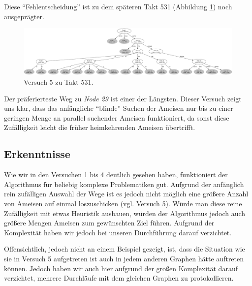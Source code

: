 Diese "`Fehlentscheidung"' ist zu dem späteren Takt 531 (Abbildung \ref{fig:v5_531}) noch ausgeprägter.

\begin{figure}[htbp]
	\includegraphics[width=\textwidth]{images/v5_531.png}
	\caption{Versuch 5 zu Takt 531.}
	\label{fig:v5_531}
\end{figure}

Der präferierteste Weg zu \emph{Node 29} ist einer der Längsten.
Dieser Versuch zeigt uns klar, dass das anfängliche "`blinde"' Suchen der Ameisen  nur bis zu einer geringen Menge an parallel suchender Ameisen funktioniert, da sonst diese Zufälligkeit leicht die früher heimkehrenden Ameisen übertrifft.

\subsection{Erkenntnisse}
Wie wir in den Versuchen 1 bis 4 deutlich gesehen haben, funktioniert der Algorithmus für beliebig komplexe Problematiken gut.
Aufgrund der anfänglich rein zufälligen Auswahl der Wege ist es jedoch nicht möglich eine größere Anzahl von Ameisen auf einmal loszuschicken (vgl. Versuch 5).
Würde man diese reine Zufälligkeit mit etwas Heuristik ausbauen, würden der Algorithmus jedoch auch größere Mengen Ameisen zum gewünschten Ziel führen.
Aufgrund der Komplexität haben wir jedoch bei unseren Durchführung darauf verzichtet.\par
Offensichtlich, jedoch nicht an einem Beispiel gezeigt, ist, dass die Situation wie sie in Versuch 5 aufgetreten ist auch in jedem anderen Graphen hätte auftreten können. Jedoch haben wir auch hier aufgrund der großen Komplexität darauf verzichtet, mehrere Durchläufe mit dem gleichen Graphen zu protokollieren.

